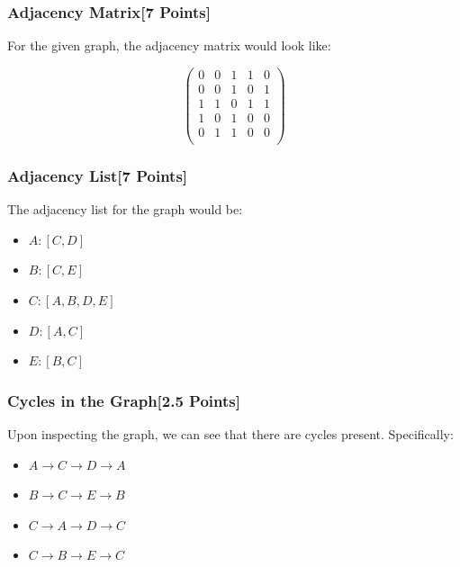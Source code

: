 \documentclass{article}
\begin{document}
\subsubsection*{Adjacency Matrix[7 Points]}

For the given graph, the adjacency matrix would look like:

\[
\begin{pmatrix}
0 & 0 & 1 & 1 & 0 \\
0 & 0 & 1 & 0 & 1 \\
1 & 1 & 0 & 1 & 1 \\
1 & 0 & 1 & 0 & 0 \\
0 & 1 & 1 & 0 & 0 \\
\end{pmatrix}
\]

\subsubsection*{Adjacency List[7 Points]}

The adjacency list for the graph would be:

\begin{itemize}
    \item \(A: [C, D]\)
    \item \(B: [C, E]\)
    \item \(C: [A, B, D, E]\)
    \item \(D: [A, C]\)
    \item \(E: [B, C]\)
\end{itemize}

\subsubsection*{Cycles in the Graph[2.5 Points]}

Upon inspecting the graph, we can see that there are cycles present. Specifically:

\begin{itemize}
    \item \(A \rightarrow C \rightarrow D \rightarrow A\)
    \item \(B \rightarrow C \rightarrow E \rightarrow B\)
    \item \(C \rightarrow A \rightarrow D \rightarrow C\)
    \item \(C \rightarrow B \rightarrow E \rightarrow C\)
\end{itemize}

\newpage
\end{document}
